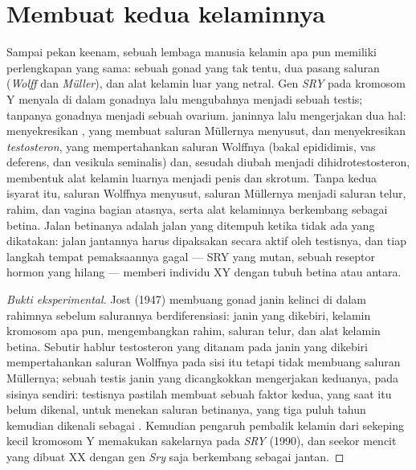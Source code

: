\section{Membuat kedua kelaminnya}

\begin{proposition}\label{prop:b2:mammal-reproduction:sex}
Sampai pekan keenam, sebuah lembaga manusia kelamin apa pun memiliki
perlengkapan yang sama: sebuah gonad yang tak tentu, dua pasang saluran
(\emph{Wolff} dan \emph{Müller}), dan alat kelamin luar yang netral.
Gen \emph{SRY} pada kromosom Y menyala di dalam gonadnya lalu
mengubahnya menjadi sebuah testis; tanpanya gonadnya menjadi sebuah
ovarium.  janinnya lalu mengerjakan dua hal: 
menyekresikan \emph{}, yang membuat saluran Müllernya
menyusut, dan  menyekresikan \emph{testosteron}, yang
mempertahankan saluran Wolffnya (bakal epididimis, vas deferens, dan
vesikula seminalis) dan, sesudah diubah menjadi dihidrotestosteron,
membentuk alat kelamin luarnya menjadi penis dan skrotum. Tanpa kedua
isyarat itu, saluran Wolffnya menyusut, saluran Müllernya menjadi
saluran telur, rahim, dan vagina bagian atasnya, serta alat kelaminnya
berkembang sebagai betina. Jalan betinanya adalah jalan yang ditempuh
ketika tidak ada yang dikatakan: jalan jantannya harus dipaksakan
secara aktif oleh testisnya, dan tiap langkah tempat pemaksaannya gagal
--- SRY yang mutan, sebuah reseptor hormon yang hilang --- memberi
individu XY dengan tubuh betina atau antara.
\end{proposition}
\begin{proof}[Bukti eksperimental]
Jost (1947) membuang gonad janin kelinci di dalam rahimnya sebelum
salurannya berdiferensiasi: janin yang dikebiri, kelamin kromosom apa
pun, mengembangkan rahim, saluran telur, dan alat kelamin betina.
Sebutir hablur testosteron yang ditanam pada janin yang dikebiri
mempertahankan saluran Wolffnya pada sisi itu tetapi tidak membuang
saluran Müllernya; sebuah testis janin yang dicangkokkan mengerjakan
keduanya, pada sisinya sendiri: testisnya pastilah membuat sebuah
faktor kedua, yang saat itu belum dikenal, untuk menekan saluran
betinanya, yang tiga puluh tahun kemudian dikenali sebagai . Kemudian pengaruh pembalik kelamin dari sekeping kecil
kromosom Y memakukan sakelarnya pada \emph{SRY} (1990), dan seekor
mencit yang dibuat XX dengan gen \emph{Sry} saja berkembang sebagai
jantan.
\end{proof}

